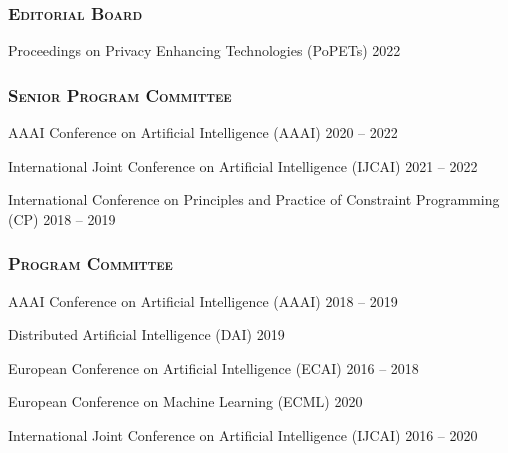 \subsubsection*{\scshape Editorial Board}{}{}{}
  \beginList
  \item Proceedings on Privacy Enhancing Technologies (PoPETs) 
  \hfill {2022}
  \endList


\subsubsection*{\scshape Senior Program Committee}{}{}{}
\beginList
  \item AAAI Conference on Artificial Intelligence (AAAI) \hfill {2020 -- 2022}

  \item International Joint Conference on Artificial Intelligence (IJCAI) \hfill {2021 -- 2022}

  \item International Conference on Principles and Practice of Constraint Programming (CP) \hfill{2018 -- 2019} 

\endList

\subsubsection*{\scshape Program Committee}{}{}{}
\beginList
  \item AAAI Conference on Artificial Intelligence (AAAI) \hfill {2018 -- 2019}

  \item Distributed Artificial Intelligence (DAI) \hfill {2019}

  \item European Conference on Artificial Intelligence (ECAI) \hfill {2016 -- 2018}

  \item European Conference on Machine Learning (ECML) \hfill {2020}


  \item International Joint Conference on Artificial Intelligence (IJCAI) \hfill {2016 -- 2020}


